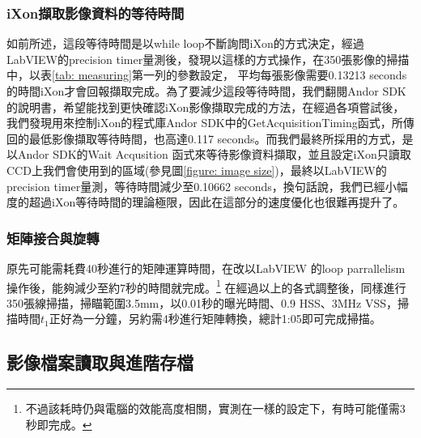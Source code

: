 \documentclass[12pt]{article}
\begin{document}
\subsubsection{iXon擷取影像資料的等待時間}
如前所述，這段等待時間是以while loop不斷詢問iXon的方式決定，經過LabVIEW的precision timer量測後，發現以這樣的方式操作，在350張影像的掃描中，以表\ref{tab: measuring}第一列的參數設定，
平均每張影像需要0.13213 seconds的時間iXon才會回報擷取完成。為了要減少這段等待時間，我們翻閱Andor SDK的說明書，希望能找到更快確認iXon影像擷取完成的方法，在經過各項嘗試後，
我們發現用來控制iXon的程式庫Andor SDK中的GetAcquisitionTiming函式，所傳回的最低影像擷取等待時間，也高達0.117 seconds。而我們最終所採用的方式，是以Andor SDK的Wait Acqusition
函式來等待影像資料擷取，並且設定iXon只讀取CCD上我們會使用到的區域(參見圖\ref{figure: image size})，最終以LabVIEW的precision timer量測，等待時間減少至0.10662 seconds，換句話說，我們已經小幅度的超過iXon等待時間的理論極限，因此在這部分的速度優化也很難再提升了。

\subsubsection{矩陣接合與旋轉}
原先可能需耗費40秒進行的矩陣運算時間，在改以LabVIEW 的loop parrallelism操作後，能夠減少至約7秒的時間就完成。\footnote{不過該耗時仍與電腦的效能高度相關，實測在一樣的設定下，有時可能僅需3秒即完成。}
在經過以上的各式調整後，同樣進行350張線掃描，掃瞄範圍3.5mm，以0.01秒的曝光時間、0.9 HSS、3MHz VSS，掃描時間$t_1$正好為一分鐘，另約需4秒進行矩陣轉換，總計1:05即可完成掃描。

\subsection{影像檔案讀取與進階存檔}
\end{document}
